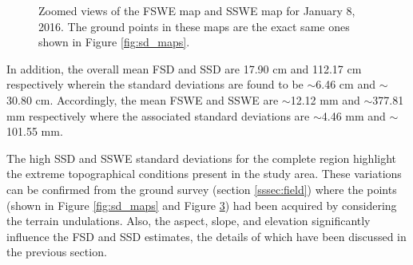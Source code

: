 \documentclass[review]{elsarticle}
\numberwithin{equation}{section}
\numberwithin{figure}{section}
\numberwithin{table}{section}
\begin{document}
\afterpage{\FloatBarrier}
\begin{figure}[htb]
    \centering
    \begin{subfigure}[t]{\textwidth}
        \caption{}
        \label{subfig:fswe_map}
    \end{subfigure}
    \begin{subfigure}[t]{\textwidth}
        \caption{}
        \label{subfig:sswe_map}
    \end{subfigure}
    \caption{Zoomed views of the  FSWE map and  SSWE map for January 8, 2016. The ground points in these maps are the exact same ones shown in Figure \ref{fig:sd_maps}.}
    \label{fig:swe_maps}
\end{figure}

In addition, the overall mean FSD and SSD are 17.90 cm and 112.17 cm respectively wherein the standard deviations are found to be $\sim$6.46 cm and $\sim$30.80 cm. Accordingly, the mean FSWE and SSWE are $\sim$12.12 mm and $\sim$377.81 mm respectively where the associated standard deviations are $\sim$4.46 mm and $\sim$101.55 mm. 

The high SSD and SSWE standard deviations for the complete region highlight the extreme topographical conditions present in the study area. These variations can be confirmed from the ground survey (section \ref{sssec:field}) where the points (shown in Figure \ref{fig:sd_maps} and Figure \ref{fig:swe_maps}) had been acquired by considering the terrain undulations. Also, the aspect, slope, and elevation significantly influence the FSD and SSD estimates, the details of which have been discussed in the previous section.
\end{document}
